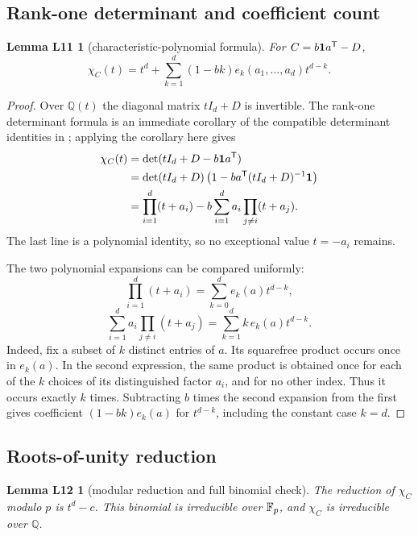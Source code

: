 \documentclass[11pt,letterpaper]{article}
\theoremstyle{plain}
\newtheorem*{lemLeleven}{Lemma L11}
\newtheorem*{lemLtwelve}{Lemma L12}
\begin{document}
\subsection{Rank-one determinant and coefficient count}

\begin{lemLeleven}[characteristic-polynomial formula]
For $C=b\mathbf{1} a^{\mathsf{T}}-D$,
\[
\chi_C(t)=t^d+\sum_{k=1}^d(1-bk)e_k(a_1,\ldots,a_d)t^{d-k}.
\]
\end{lemLeleven}

\begin{proof}
Over $\mathbb Q(t)$ the diagonal matrix $tI_d+D$ is invertible.  The rank-one determinant formula is an immediate corollary of the compatible determinant identities in \cite[Appendix A.12 and A.26(2), pp.~651, 658]{StdKailath1980LinearSystems}; applying the corollary here gives
\begin{align*}
\chi_C(t)
&=\det(tI_d+D-b\mathbf{1} a^{\mathsf{T}})\\
&=\det(tI_d+D)\left(1-ba^{\mathsf{T}}(tI_d+D)^{-1}\mathbf{1}\right)\\
&=\prod_{i=1}^d(t+a_i)-b\sum_{i=1}^d a_i\prod_{j\ne i}(t+a_j).
\end{align*}
The last line is a polynomial identity, so no exceptional value $t=-a_i$ remains.

The two polynomial expansions can be compared uniformly:
\[
\prod_{i=1}^d(t+a_i)
=\sum_{k=0}^d e_k(a)t^{d-k},
\]
\[
\sum_{i=1}^d a_i\prod_{j\ne i}(t+a_j)
=\sum_{k=1}^d k\,e_k(a)t^{d-k}.
\]
Indeed, fix a subset of $k$ distinct entries of $a$.  Its squarefree product occurs once in $e_k(a)$.  In the second expression, the same product is obtained once for each of the $k$ choices of its distinguished factor $a_i$, and for no other index.  Thus it occurs exactly $k$ times.  Subtracting $b$ times the second expansion from the first gives coefficient $(1-bk)e_k(a)$ for $t^{d-k}$, including the constant case $k=d$.
\end{proof}

\subsection{Roots-of-unity reduction}

\begin{lemLtwelve}[modular reduction and full binomial check]
The reduction of $\chi_C$ modulo $p$ is $t^d-c$.  This binomial is irreducible over $\mathbb{F}_{p}$, and $\chi_C$ is irreducible over $\mathbb Q$.
\end{lemLtwelve}
\end{document}
